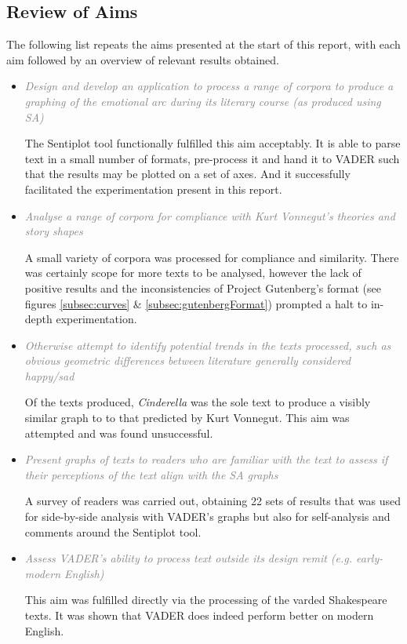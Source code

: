 \documentclass{article}
\begin{document}
    \subsection{Review of Aims}
        The following list repeats the aims presented at the start of this report, with each aim followed by an overview of relevant results obtained.
        \begin{itemize}
            \item \textcolor{gray}{\textit{Design and develop an application to process a range of corpora to produce a graphing of the emotional arc during its literary course (as produced using SA)}}
            
            The Sentiplot tool functionally fulfilled this aim acceptably. It is able to parse text in a small number of formats, pre-process it and hand it to VADER such that the results may be plotted on a set of axes. And it successfully facilitated the experimentation present in this report.

            \item \textcolor{gray}{\textit{Analyse a range of corpora for compliance with Kurt Vonnegut’s theories and story shapes}}
            
            A small variety of corpora was processed for compliance and similarity. There was certainly scope for more texts to be analysed, however the lack of positive results and the inconsistencies of Project Gutenberg's format (see figures \ref{subsec:curves} \& \ref{subsec:gutenbergFormat}) prompted a halt to in-depth experimentation.
            \item \textcolor{gray}{\textit{Otherwise attempt to identify potential trends in the texts processed, such as obvious geometric differences between literature generally considered happy/sad}}
            
            Of the texts produced, \textit{Cinderella} was the sole text to produce a visibly similar graph to to that predicted by Kurt Vonnegut. This aim was attempted and was found unsuccessful.
            \item \textcolor{gray}{\textit{Present graphs of texts to readers who are familiar with the text to assess if their perceptions of the text align with the SA graphs}}
            
            A survey of readers was carried out, obtaining 22 sets of results that was used for side-by-side analysis with VADER's graphs but also for self-analysis and comments around the Sentiplot tool.
            \item \textcolor{gray}{\textit{Assess VADER's ability to process text outside its design remit (e.g. early-modern English)}}
            
            This aim was fulfilled directly via the processing of the varded Shakespeare texts. It was shown that VADER does indeed perform better on modern English.
        \end{itemize}
\end{document}
